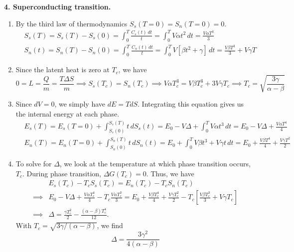 \documentclass{article}
\theoremstyle{definition}
\newcommand{\al}{\alpha}
\newcommand{\be}{\beta}
\newcommand{\f}[2]{\frac{#1}{#2}}
\newcommand{\lb}{\left[}
\newcommand{\rb}{\right]}
\begin{document}
\noindent \textbf{4. Superconducting transition.} 


\begin{enumerate}[label=(\alph*)]
	\item By the third law of thermodynamics $S_s(T=0) = S_n(T=0) = 0$. 
	\begin{align*}
	&\boxed{S_s(T)} = S_s(T) - S_s(0) = \int^T_0 \f{C_s(t)\,dt}{t} = \int^T_0 V\al t^2\,dt = \boxed{\f{V\al T^3}{3}}\\
	&\boxed{S_n(t)} = S_n(T) - S_n(0) = \int^T_0 \f{C_n(t)\,dt}{t} = \int^T_0 V[\be t^2 + \gamma]\,dt = 
	\boxed{\f{V\be T^3}{3} + V\gamma T}
	\end{align*}
	
	
	\item Since the latent heat is zero at $T_c$, we have
	\begin{equation*}
	0 = L = \f{Q}{m} = \f{T\Delta S}{m} \implies S_s(T_c) = S_n(T_c) \implies V\al T_c^3 = V\beta T_c^3 + 3V \gamma T_c \implies \boxed{T_c = \sqrt{\f{3\gamma}{\al - \be}}}
	\end{equation*}
	
	
	\item Since $dV=0$, we simply have $dE = TdS$. Integrating this equation gives us the internal energy at each phase. 
	\begin{align*}
	&\boxed{E_s(T)} = E_s(T=0) + \int^{S_s(T)}_{S_s(0)} t \,dS_s(t) = E_0 - V\Delta + \int^T_0 V\al t^3\,dt = \boxed{E_0 - V\Delta + \f{V\al T^4}{4}}\\
	&\boxed{E_n(T)} = E_n(T=0) + \int^{S_n(T)}_{S_n(0)} t \,dS_n(t) = E_0 + \int^T_0 V\be t^3 + V\gamma t\,dt = \boxed{E_0 + \f{V\beta T^4}{4} + \f{V\gamma T^2}{2}}
	\end{align*}
	
	
	
	
	\item To solve for $\Delta$, we look at the temperature at which phase transition occurs, $T_c$. During phase transition, $\Delta G(T_c) = 0$. Thus, we have
	\begin{align*}
	&E_s(T_c) - T_c S_s(T_c) = E_n(T_c) - T_c S_n(T_c) \\
	\implies &E_0 - V\Delta + \f{V\al T_c^4}{4} - T_c\f{V\al T_c^3}{3} =  E_0 + \f{V\beta T_c^4}{4} + \f{V\gamma T_c^2}{2} -T_c \lb \f{V\be T_c^3}{3} + V\gamma T_c\rb\\
	\implies & \Delta = \f{\gamma T_c^2}{2}- \f{(\al-\be)T_c^4}{12}.
	\end{align*}
	With $T_c = \sqrt{3\gamma/(\al-\be)}$, we find 
	\begin{equation*}
	\boxed{\Delta = \f{3 \gamma^2}{4 (\al-\be)}}
	\end{equation*}
	

\end{enumerate}
\end{document}
